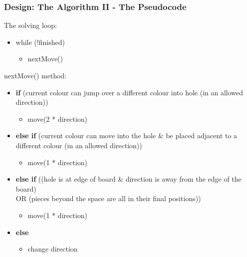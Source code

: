 \documentclass{beamer}
\begin{document}
	\begin{frame}
		\frametitle{Design: The Algorithm II - The Pseudocode}
		The solving loop:
		\begin{itemize}
			\item[] while (!finished)
			\begin{itemize}
				\item[] nextMove()
			\end{itemize}		
		\end{itemize}
		\bigskip
		nextMove() method:
		\begin{itemize}
			\item[] \textbf{if} (current colour can jump over a different colour into hole (in an allowed direction))
			\begin{itemize}
				\item[] move(2 * direction)
			\end{itemize}	
			\item[] \textbf{else if}	(current colour can move into the hole \& be placed adjacent 
			to a different colour (in an allowed direction))
			\begin{itemize}
				\item[] move(1 * direction)
			\end{itemize}
			
			\item[] \textbf{else if}	((hole is at edge of board \& direction is away from the edge of the board) \\
			OR (pieces beyond the space are all in their final positions))
			\begin{itemize}
				\item[] move(1 * direction)
			\end{itemize}
			\item[] \textbf{else} 
			\begin{itemize}
				\item[] change direction
			\end{itemize}

		\end{itemize}
		
		
	\end{frame}
	
\end{document}
